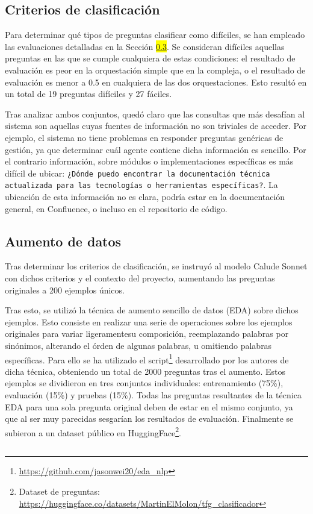 \subsection{Criterios de clasificación}
Para determinar qué tipos de preguntas clasificar como difíciles, se han empleado las evaluaciones detalladas en la Sección \colorbox{yellow}{\ref{}}. Se consideran difíciles aquellas preguntas en las que se cumple cualquiera de estas condiciones: el resultado de evaluación es peor en la orquestación simple que en la compleja, o el resultado de evaluación es menor a 0.5 en cualquiera de las dos orquestaciones. Esto resultó en un total de 19 preguntas difíciles y 27 fáciles. 

Tras analizar ambos conjuntos, quedó claro que las consultas que más desafían al sistema son aquellas cuyas fuentes de información no son triviales de acceder. Por ejemplo, el sistema no tiene problemas en responder preguntas genéricas de gestión, ya que determinar cuál agente contiene dicha información es sencillo. Por el contrario información, sobre módulos o implementaciones específicas es más difícil de ubicar: \texttt{¿Dónde puedo encontrar la documentación técnica actualizada para las tecnologías o herramientas específicas?}. La ubicación de esta información no es clara, podría estar en la documentación general, en Confluence, o incluso en el repositorio de código. 

\subsection{Aumento de datos}
Tras determinar los criterios de clasificación, se instruyó al modelo Calude Sonnet con dichos criterios y el contexto del proyecto, aumentando las preguntas originales a 200 ejemplos únicos.

Tras esto, se utilizó la técnica de aumento sencillo de datos (EDA) \cite{} sobre dichos ejemplos. Esto consiste en realizar una serie de operaciones sobre los ejemplos originales para variar ligeramentesu composición, reemplazando palabras por sinónimos, alterando el órden de algunas palabras, u omitiendo palabras específicas. Para ello se ha utilizado el script\footnote{\url{https://github.com/jasonwei20/eda_nlp}} desarrollado por los autores de dicha técnica, obteniendo un total de 2000 preguntas tras el aumento.   
Estos ejemplos se dividieron en tres conjuntos individuales: entrenamiento (75\%), evaluación (15\%) y pruebas (15\%). Todas las preguntas resultantes de la técnica EDA para una sola pregunta original deben de estar en el mismo conjunto, ya que al ser muy parecidas sesgarían los resultados de evaluación. Finalmente se subieron a un dataset público en HuggingFace\footnote{Dataset de preguntas: \url{https://huggingface.co/datasets/MartinElMolon/tfg_clasificador}}. 

\subsection{}




